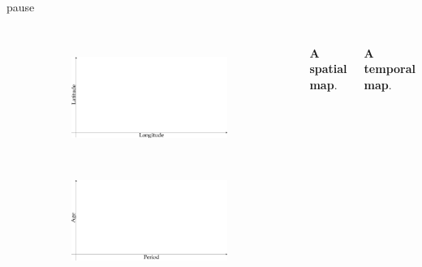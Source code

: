 \documentclass{beamer}
\begin{document}
\begin{frame}{pause}
\frametitle{\insertsection}

\begin{columns}[c]

\begin{figure}[!htb]
\centering
\begin{subfigure}[c]{\textwidth}
\includegraphics[width = \textwidth]{../fig/talk/spatial_map_empty.pdf}
\end{subfigure}\\
\begin{subfigure}[c]{\textwidth}
\includegraphics[width = \textwidth]{../fig/talk/temporal_map_empty.pdf}
\end{subfigure}
\end{figure}

\footnotesize\textbf{A spatial map}.

\vspace{2.5cm}

\footnotesize\textbf{A temporal map}.

\end{columns}

\end{frame}
\end{document}
